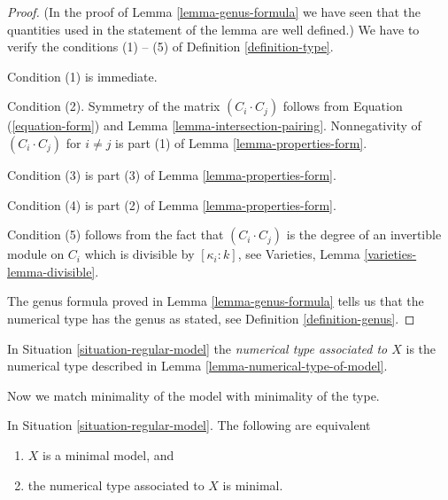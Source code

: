 \begin{proof}
(In the proof of Lemma \ref{lemma-genus-formula}
we have seen that the quantities
used in the statement of the lemma are well defined.)
We have to verify the conditions (1) -- (5) of
Definition \ref{definition-type}.

\medskip\noindent
Condition (1) is immediate.

\medskip\noindent
Condition (2). Symmetry of the matrix $(C_i \cdot C_j)$ follows from
Equation (\ref{equation-form}) and
Lemma \ref{lemma-intersection-pairing}.
Nonnegativity of $(C_i \cdot C_j)$ for $i \not = j$
is part (1) of Lemma \ref{lemma-properties-form}.

\medskip\noindent
Condition (3) is part (3) of Lemma \ref{lemma-properties-form}.

\medskip\noindent
Condition (4) is part (2) of Lemma \ref{lemma-properties-form}.

\medskip\noindent
Condition (5) follows from the fact that $(C_i \cdot C_j)$ is
the degree of an invertible module on $C_i$ which is divisible
by $[\kappa_i : k]$, see Varieties, Lemma \ref{varieties-lemma-divisible}.

\medskip\noindent
The genus formula proved in Lemma \ref{lemma-genus-formula}
tells us that the numerical type has the genus as stated, see
Definition \ref{definition-genus}.
\end{proof}

\begin{definition}
\label{definition-numerical-type-model}
In Situation \ref{situation-regular-model} the
{\it numerical type associated to $X$} is the numerical
type described in Lemma \ref{lemma-numerical-type-of-model}.
\end{definition}

\noindent
Now we match minimality of the model with minimality of the type.

\begin{lemma}
\label{lemma-numerical-type-minimal-model}
In Situation \ref{situation-regular-model}. The following
are equivalent
\begin{enumerate}
\item $X$ is a minimal model, and
\item the numerical type associated to $X$ is minimal.
\end{enumerate}
\end{lemma}

